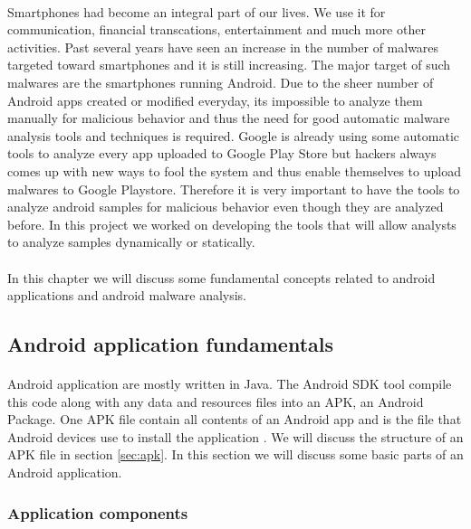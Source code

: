 \documentclass[../main.tex]{subfile}
\begin{document}
	\paragraph{} Smartphones had become an integral part of our lives. We use it for communication, financial transcations, entertainment and much more other activities. Past several years have seen an increase in the number of malwares targeted toward smartphones and it is still increasing. The major target of such malwares are the smartphones running Android. Due to the sheer number of Android apps created or modified everyday, its impossible to analyze them manually for malicious behavior and thus the need for good automatic malware analysis tools and techniques is required. Google is already using some automatic tools to analyze every app uploaded to Google Play Store but hackers always comes up with new ways to fool the system and thus enable themselves to upload malwares to Google Playstore. Therefore it is very important to have the tools to analyze android samples for malicious behavior even though they are analyzed before. In this project we worked on developing the tools that will allow analysts to analyze samples dynamically or statically.
	\paragraph{} In this chapter we will discuss some fundamental concepts related to android applications and android malware analysis.
	
	\subsection{Android application fundamentals}\label{sec:app_fundamentals}
		\paragraph{} Android application are mostly written in Java. The Android SDK tool compile this code along with any data and resources files into an APK, an Android Package. One APK file contain all contents of an Android app and is the file that Android devices use to install the application \cite{app_fundamentals}. We will discuss the structure of an APK file in section \ref{sec:apk}. In this section we will discuss some basic parts of an Android application.
		
		\subsubsection{Application components}
\end{document}
